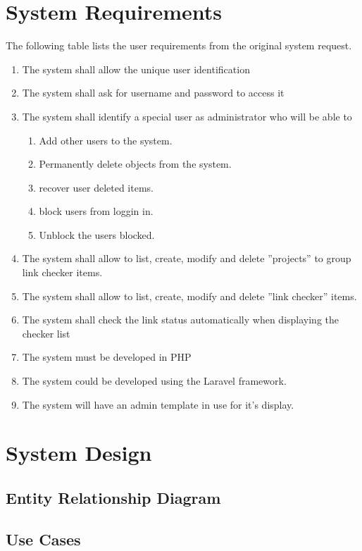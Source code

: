 \section{System Requirements}
The following table lists the user requirements from the original system request.
\begin{enumerate}
	\item The system shall allow the unique user identification
	\item The system shall ask for username and password to access it
	\item The system shall identify a special user as administrator who will be able to
	\begin{enumerate}
		\item Add other users to the system.
		\item Permanently delete objects from the system.
		\item recover user deleted items.
		\item block users from loggin in.
		\item Unblock the users blocked.
	\end{enumerate}
	\item The system shall allow to list, create, modify and delete ''projects'' to group link checker items.
	\item The system shall allow to list, create, modify and delete ''link checker'' items.
	\item The system shall check the link status automatically when displaying the checker list
	\item The system must be developed in PHP
	\item The system could be developed using the Laravel framework.
	\item The system will have an admin template in use for it's display.
\end{enumerate}

\section{System Design}

\subsection{Entity Relationship Diagram}

\subsection{Use Cases}

